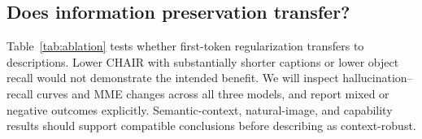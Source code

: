 \subsection{Does information preservation transfer?}
Table~\ref{tab:ablation} tests whether first-token regularization transfers
to descriptions. Lower CHAIR with substantially shorter captions or lower
object recall would not demonstrate the intended benefit. We will inspect
hallucination--recall curves and MME changes across all three models, and
report mixed or negative outcomes explicitly. Semantic-context, natural-image,
and capability results should support compatible conclusions before
describing \method as context-robust.
